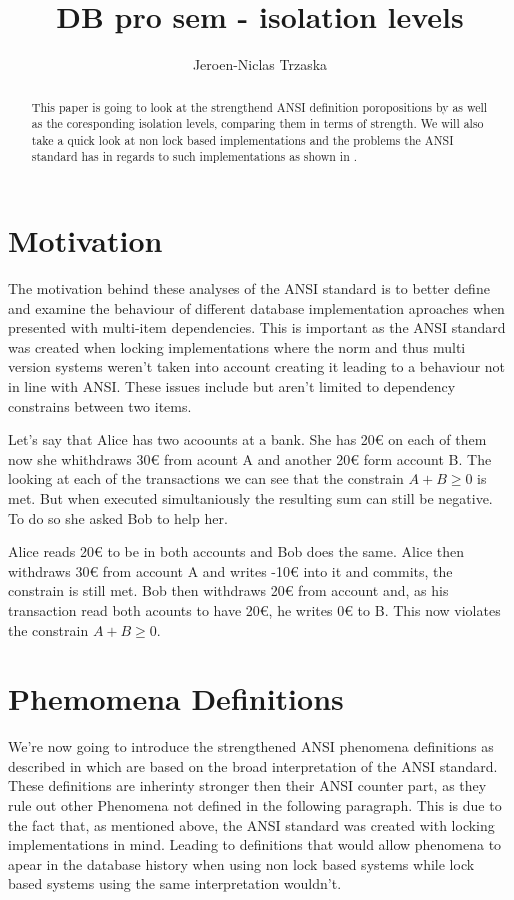 \documentclass[sigconf, review=true]{acmart}
\author{Jeroen-Niclas Trzaska}
\title{DB pro sem - isolation levels}
\affiliation{%
   \institution{TU Dresden}
   \city{Dresden}
   \state{Saxony}
   \country{Germany}}
\begin{document}
\begin{abstract}

    This paper is going to look at the strengthend ANSI definition poropositions by \cite{Adya_Liskov_O_Neil_2000} as well as the coresponding isolation levels,
    comparing them in terms of strength. We will also take a quick look at non lock based implementations
    and the problems the ANSI standard has in regards to such implementations as shown in \cite{Berenson_Bernstein_Gray_Melton_O_Neil_O_Neil_1995}.
\end{abstract}
\maketitle

\section{Motivation}
The motivation behind these analyses of the ANSI standard is to better define and examine the
behaviour of different database implementation aproaches when presented with multi-item dependencies.
This is important as the ANSI standard was created when locking implementations where the norm and thus multi version systems weren't
taken into account creating it leading to a behaviour not in line with ANSI.
These issues include but aren't limited to dependency constrains between two items.

Let's say that Alice has two acoounts at a bank. She has 20€ on each of them now she whithdraws 30€ from acount A and another 20€ form account B.
The looking at each of the transactions we can see that the constrain $A+B \geq 0$ is met.
But when executed simultaniously the resulting sum can still be negative. To do so
she asked Bob to help her.
\begin{example}
    Alice reads 20€ to be in both accounts and Bob does the same. Alice then withdraws 30€ from account A and writes -10€ into it and commits, the constrain is still met.
    Bob then withdraws 20€ from account and, as his transaction read both acounts to have 20€, he writes 0€  to B. This now violates the constrain $A+B \geq 0$.
\end{example}
\section{Phemomena Definitions}
We're now going to introduce the strengthened ANSI phenomena definitions as described in \cite{Adya_Liskov_O_Neil_2000}  which
are based on the broad interpretation of the ANSI standard. These definitions are inherinty stronger then their ANSI counter part,
as they rule out other Phenomena not defined in the following paragraph. This is due to the fact that, as mentioned above, the ANSI standard
was created with locking implementations in mind. Leading to definitions that would allow phenomena to apear in the database history when using non lock based systems
while lock based systems using the same interpretation wouldn't.
\end{document}
